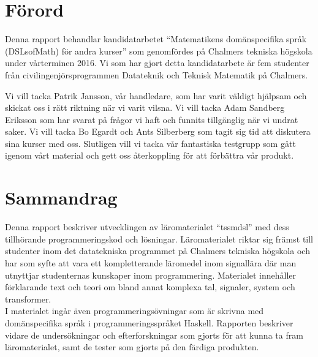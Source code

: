 \documentclass[12pt,a4paper,twoside,openright]{article}
\date{\today}
\begin{document}




\setlength{\parskip}{2mm}
\setlength{\parindent}{0pt}

%
%
%
%


\section*{Förord}
Denna rapport behandlar kandidatarbetet ``Matematikens domänspecifika
språk (DSLsofMath) för andra kurser'' som genomfördes på Chalmers
tekniska högskola under vårterminen 2016. Vi som har gjort detta
kandidatarbete är fem studenter från civilingenjörsprogrammen
Datateknik och Teknisk Matematik på Chalmers.

Vi vill tacka Patrik Jansson, vår handledare, som har varit väldigt
hjälpsam och skickat oss i rätt riktning när vi varit vilsna. Vi vill
tacka Adam Sandberg Eriksson som har svarat på frågor vi haft och
funnits tillgänglig när vi undrat saker. Vi vill tacka Bo Egardt och
Ants Silberberg som tagit sig tid att diskutera sina kurser med
oss. Slutligen vill vi tacka vår fantastiska testgrupp som gått
igenom vårt material och gett oss återkoppling för att förbättra vår
produkt.

\newpage

\thispagestyle{plain}

\section*{Sammandrag}
Denna rapport beskriver utvecklingen av läromaterialet ``\gls{tssmdsl}''
med dess tillhörande programmeringskod och lösningar. Läromaterialet
riktar sig främst till studenter inom det datatekniska programmet på
Chalmers tekniska högskola och har som syfte att vara ett
kompletterande läromedel inom signallära där man utnyttjar
studenternas kunskaper inom programmering. Materialet innehåller
förklarande text och teori om bland annat komplexa tal, signaler,
system och transformer. \\I materialet ingår även programmeringsövningar
som är skrivna med domänspecifika språk i programmeringsspråket
\gls{Haskell}. Rapporten beskriver vidare de undersökningar och efterforskningar som
gjorts för att kunna ta fram läromaterialet, samt de tester som
gjorts på den färdiga produkten.
\end{document}
